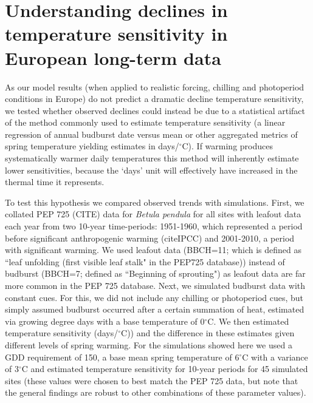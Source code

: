 \documentclass{article}
\begin{document}
\section*{Understanding declines in temperature sensitivity in European long-term data}
As our model results (when applied to realistic forcing, chilling and photoperiod conditions in Europe) do not predict a dramatic decline temperature sensitivity, we tested whether observed declines could instead be due to a statistical artifact of the method commonly used to estimate temperature sensitivity (a linear regression of annual budburst date versus mean or other aggregated metrics of spring temperature yielding estimates in days/$^{\circ}$C). If warming produces systematically warmer daily temperatures this method will inherently estimate lower sensitivities, because the `days' unit will effectively have increased in the thermal time it represents.

\par To test this hypothesis we compared observed trends with simulations. First, we collated PEP 725 (CITE) data for \emph{Betula pendula} for all sites with leafout data each year from two 10-year time-periods: 1951-1960, which represented a period before significant anthropogenic warming (citeIPCC) and 2001-2010, a period with significant warming. We used leafout data (BBCH=11; which is defined as ``leaf unfolding (first visible leaf stalk" in the PEP725 database)) instead of budburst (BBCH=7; defined as ``Beginning of sprouting") as leafout data are far more common in the PEP 725 database. %
Next, we simulated budburst data with constant cues. For this, we did not include any chilling or photoperiod cues, but simply assumed budburst occurred after a certain summation of heat, estimated via growing degree days with a base temperature of 0$^{\circ}$C. We then estimated temperature sensitivity (days/$^{\circ}$C)) and the difference in these estimates given different levels of spring warming. For the simulations showed here we used a GDD requirement of 150, a base mean spring temperature of 6$^{\circ}$C with a variance of 3$^{\circ}$C and estimated temperature sensitivity for 10-year periods for 45 simulated sites (these values were chosen to best match the PEP 725 data, but note that the general findings are robust to other combinations of these parameter values).
\end{document}
